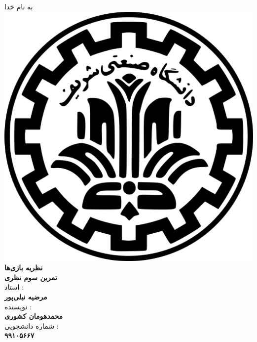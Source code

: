 \begin{center}
    به نام خدا
    \\
    \includegraphics[scale=0.02]{commons/sharif.png}
    \\
    \vspace*{5mm}
    \textbf{\Huge{نظریه بازی‌ها}}
    \hspace*{1mm}
    \vspace*{5mm}
    \\
    \vspace*{5mm}
    \textbf{تمرین سوم نظری}
    \\
    \vspace*{7mm}
    استاد :
    \\
    \vspace*{2mm}
    \textbf{\Large{مرضیه نیلی‌پور}}
    \\
    \vspace*{7mm}
    نویسنده :
    \\
    \vspace*{2mm}
    \textbf{\Large{محمدهومان کشوری}}
    \\
    \vspace*{7mm}
    شماره دانشجویی :
    \\
    \vspace*{2mm}
    \textbf{\Large{۹۹۱۰۵۶۶۷}}
\end{center}